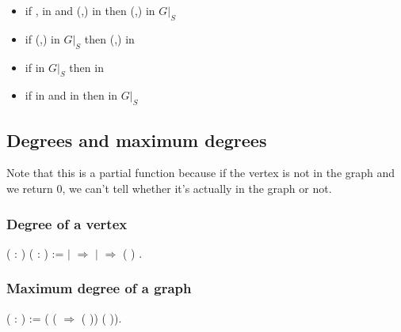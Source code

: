 \begin{itemize}
\item  if ,  in  and (,) in  then (,) in $G|_S$

\item  if (,) in $G|_S$ then (,) in 

\item  if  in $G|_S$ then  in 

\item  if  in  and  in  then  in $G|_S$

\end{itemize}


\subsection{Degrees and maximum degrees}

 Note that this is a partial function because if the vertex is not
    in the graph and we return 0, we can't tell whether it's actually
    in the graph or not. \subsubsection{Degree of a vertex}


\begin{coqdoccode}
\coqdocnoindent
{}  ( : ) ( : ) :=\coqdoceol
\coqdocindent{1.00em}
    \coqdoceol
\coqdocindent{1.00em}
\ensuremath{|}  \ensuremath{\Rightarrow} \coqdoceol
\coqdocindent{1.00em}
\ensuremath{|}   \ensuremath{\Rightarrow}  ( )\coqdoceol
\coqdocindent{1.00em}
.\coqdoceol
\coqdocemptyline
\end{coqdoccode}
\subsubsection{Maximum degree of a graph}


\begin{coqdoccode}
\coqdocnoindent
{}  ( : ) :=  ( (  \ensuremath{\Rightarrow}  ( )) ( )).\coqdoceol
\coqdocemptyline
\end{coqdoccode}
